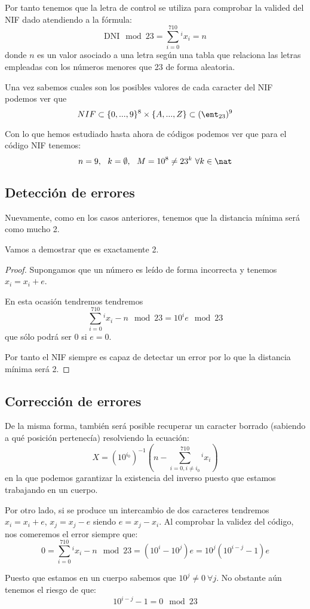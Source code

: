 Por tanto tenemos que la letra de control se utiliza para comprobar la valided del NIF dado atendiendo a la fórmula:
\[\text{DNI}\mod 23 = \sum_{i=0}^710^{i}x_i= n\]
donde $n$ es un valor asociado a una letra según una tabla que relaciona las letras empleadas con los números menores que 23 de forma aleatoria.

Una vez sabemos cuales son los posibles valores de cada caracter del NIF podemos ver que
\[NIF \subset \{0,...,9\}^8 \times \{A,...,Z\} \subset (\ent_{23})^9\]

Con lo que hemos estudiado hasta ahora de códigos podemos ver que para el código NIF tenemos:
\[n=9, \ \ k=\emptyset, \ \ M = 10^{8}\neq 23^k \ \forall k \in \nat\]

\subsection{Detección de errores}
Nuevamente, como en los casos anteriores, tenemos que la distancia mínima será como mucho 2.

Vamos a demostrar que es exactamente 2.
\begin{proof}
Supongamos que un número es leído de forma incorrecta y tenemos $x_i=x_i+e$.

En esta ocasión tendremos tendremos
\[\sum_{i=0}^710^{i}x_i - n \mod 23 = 10^{i} e \mod 23\]
que sólo podrá ser 0 si $e=0$.

Por tanto el NIF siempre es capaz de detectar un error por lo que la distancia mínima será 2.
\end{proof}

\subsection{Corrección de errores}
De la misma forma, también será posible recuperar un caracter borrado (sabiendo a qué posición pertenecía) resolviendo la ecuación:
\[X=(10^{i_0})^{-1} \left( n- \sum_{i=0,i\neq i_0}^710^{i}x_i \right)\]
en la que podemos garantizar la existencia del inverso puesto que estamos trabajando en un cuerpo.

Por otro lado, si se produce un intercambio de dos caracteres tendremos $x_i=x_i+e$, $x_j=x_j-e$ siendo $e=x_j-x_i$. Al comprobar la validez del código, nos comeremos el error siempre que:
\[0 = \sum_{i=0}^710^{i}x_i - n \mod 23 =(10^i-10^j)e = 10^j(10^{i-j}-1)e\]

Puesto que estamos en un cuerpo sabemos que $10^j\neq 0 \ \forall j$. No obstante aún tenemos el riesgo de que:
\[10^{i-j}-1 = 0 \mod 23\]


